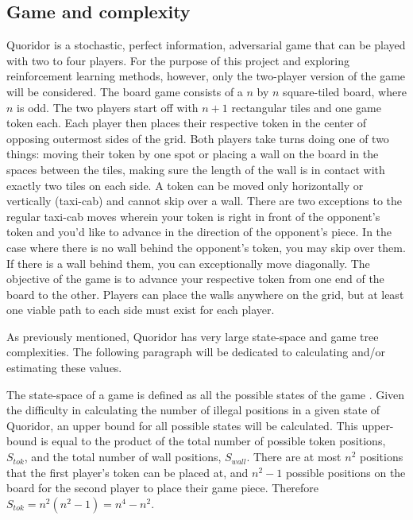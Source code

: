 \documentclass[journal, a4paper]{IEEEtran}
\begin{document}
\subsection{Game and complexity}
\label{ssec:complexity}

Quoridor is a stochastic, perfect information, adversarial game that can be played with two to four players. For the purpose of this project and exploring reinforcement learning methods, however, only the two-player version of the game will be considered. The board game consists of a $n$ by $n$ square-tiled board, where $n$ is odd. 
The two players start off with $n+1$ rectangular tiles and one game token each. Each player then places their respective token in the center of opposing outermost sides of the grid. Both players take turns doing one of two things: moving their token by one spot or placing a wall on the board in the spaces between the tiles, making sure the length of the wall is in contact with exactly two tiles on each side. 
A token can be moved only horizontally or vertically (taxi-cab) and cannot skip over a wall. There are two exceptions to the regular taxi-cab moves wherein your token is right in front of the opponent's token and you'd like to advance in the direction of the opponent's piece. In the case where there is no wall behind the opponent's token, you may skip over them. If there is a wall behind them, you can exceptionally move diagonally.
The objective of the game is to advance your respective token from one end of the board to the other. Players can place the walls anywhere on the grid, but at least one viable path to each side must exist for each player. 

As previously mentioned, Quoridor has very large state-space and game tree complexities. The following paragraph will be dedicated to calculating and/or estimating these values. 

The state-space of a game is defined as all the possible states of the game \cite{heuristic-agent}. Given the difficulty in calculating the number of illegal positions in a given state of Quoridor, an upper bound for all possible states will be calculated. 
This upper-bound is equal to the product of the total number of possible token positions, $S_{tok}$, and the total number of wall positions, $S_{wall}$.  There are at most $n^{2}$ positions that the first player's token can be placed at, and $n^{2} -1$ possible positions on the board for the second player to place their game piece. Therefore $S_{tok} = n^{2}(n^{2}-1) = n^{4} - n^{2}$.
\end{document}
